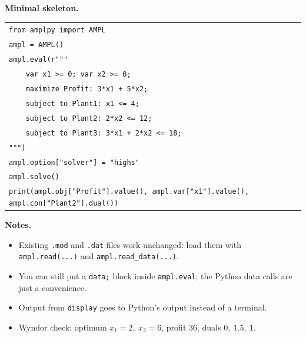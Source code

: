 \documentclass[10pt]{article}
\newcommand{\code}[1]{\texttt{\small #1}}
\begin{document}
\medskip
\textbf{Minimal skeleton.}

\begin{tabular}{@{}p{6.9in}@{}}
\code{from amplpy import AMPL}\\
\code{ampl = AMPL()}\\
\code{ampl.eval(r"""}\\
\code{\ \ \ \ var x1 >= 0;  var x2 >= 0;}\\
\code{\ \ \ \ maximize Profit: 3*x1 + 5*x2;}\\
\code{\ \ \ \ subject to Plant1: x1 <= 4;}\\
\code{\ \ \ \ subject to Plant2: 2*x2 <= 12;}\\
\code{\ \ \ \ subject to Plant3: 3*x1 + 2*x2 <= 18;}\\
\code{""")}\\
\code{ampl.option["solver"] = "highs"}\\
\code{ampl.solve()}\\
\code{print(ampl.obj["Profit"].value(), ampl.var["x1"].value(), ampl.con["Plant2"].dual())}
\end{tabular}

\medskip
\textbf{Notes.}
\begin{itemize}\setlength{\itemsep}{1pt}
\item Existing \code{.mod} and \code{.dat} files work unchanged: load them with \code{ampl.read(...)} and \code{ampl.read\_data(...)}.
\item You can still put a \code{data;} block inside \code{ampl.eval}; the Python data calls are just a convenience.
\item Output from \code{display} goes to Python's output instead of a terminal.
\item Wyndor check: optimum $x_1=2,\ x_2=6$, profit $36$, duals $0,\ 1.5,\ 1$.
\end{itemize}
\end{document}
